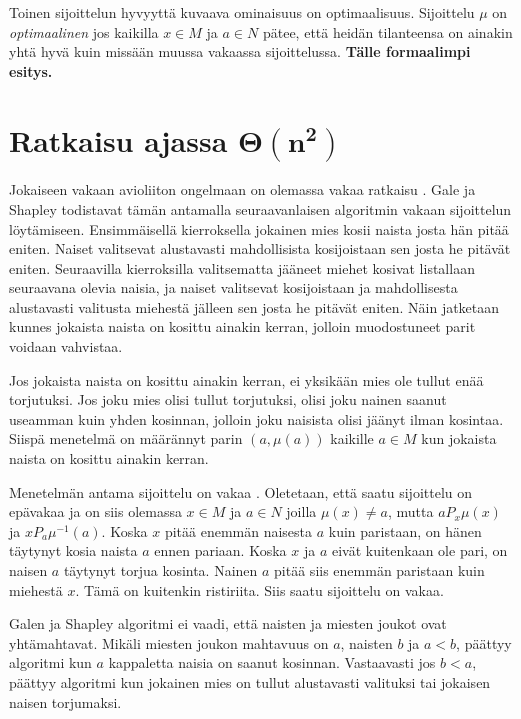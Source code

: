 \documentclass[gradu, twoside]{tktltiki}
\begin{document}
Toinen sijoittelun hyvyyttä kuvaava ominaisuus on optimaalisuus.
Sijoittelu $\mu$ on \emph{optimaalinen} jos kaikilla $x \in M$ ja $a
\in N$ pätee, että heidän tilanteensa on ainakin yhtä hyvä kuin
missään muussa vakaassa sijoittelussa. \textbf{Tälle formaalimpi
  esitys.}

\section{Ratkaisu ajassa $\boldsymbol{\Theta(n^2)}$}

Jokaiseen vakaan avioliiton ongelmaan on olemassa vakaa ratkaisu
\cite{galeshapley62}. Gale ja Shapley todistavat tämän antamalla
seuraavanlaisen algoritmin vakaan sijoittelun löytämiseen.
Ensimmäisellä kierroksella jokainen mies kosii naista josta hän pitää
eniten. Naiset valitsevat alustavasti mahdollisista kosijoistaan sen
josta he pitävät eniten. Seuraavilla kierroksilla valitsematta jääneet
miehet kosivat listallaan seuraavana olevia naisia, ja naiset
valitsevat kosijoistaan ja mahdollisesta alustavasti valitusta
miehestä jälleen sen josta he pitävät eniten. Näin jatketaan kunnes
jokaista naista on kosittu ainakin kerran, jolloin muodostuneet parit
voidaan vahvistaa.

Jos jokaista naista on kosittu ainakin kerran, ei yksikään mies ole
tullut enää torjutuksi. Jos joku mies olisi tullut torjutuksi, olisi
joku nainen saanut useamman kuin yhden kosinnan, jolloin joku naisista
olisi jäänyt ilman kosintaa. Siispä menetelmä on määrännyt parin $(a,
\mu(a))$ kaikille $a \in M$ kun jokaista naista on kosittu ainakin
kerran.

Menetelmän antama sijoittelu on vakaa \cite{galeshapley62}. Oletetaan,
että saatu sijoittelu on epävakaa ja on siis olemassa $x \in M$ ja $a
\in N$ joilla $\mu(x) \neq a$, mutta $aP_x\mu(x)$ ja
$xP_a\mu^{-1}(a)$. Koska $x$ pitää enemmän naisesta $a$ kuin
paristaan, on hänen täytynyt kosia naista $a$ ennen pariaan. Koska $x$
ja $a$ eivät kuitenkaan ole pari, on naisen $a$ täytynyt torjua
kosinta. Nainen $a$ pitää siis enemmän paristaan kuin miehestä $x$.
Tämä on kuitenkin ristiriita. Siis saatu sijoittelu on vakaa.

Galen ja Shapley algoritmi ei vaadi, että naisten ja miesten joukot
ovat yhtämahtavat. Mikäli miesten joukon mahtavuus on $a$, naisten $b$
ja $a < b$, päättyy algoritmi kun $a$ kappaletta naisia on saanut
kosinnan. Vastaavasti jos $b < a$, päättyy algoritmi kun jokainen mies
on tullut alustavasti valituksi tai jokaisen naisen torjumaksi.
\cite{galeshapley62}
\end{document}
